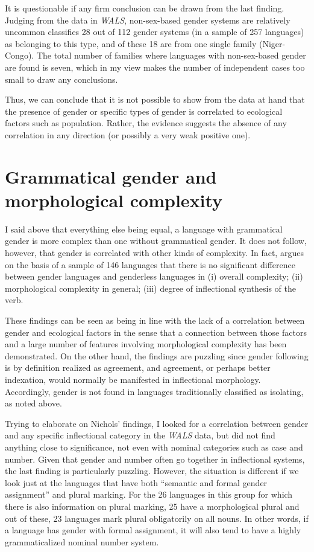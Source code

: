\documentclass[output=collectionpaper]{langsci/langscibook}
\begin{document}
It is questionable if any firm conclusion can be drawn from the last finding. Judging from the data in \textit{WALS}, non-sex-based gender systems are relatively uncommon \textendash{} \citet{Corbett2013b} classifies 28 out of 112 gender systems (in a sample of 257 languages) as belonging to this type, and of these 18 are from one single family (Niger-Congo). The total number of families where languages with non-sex-based gender are found is seven, which in my view makes the number of independent cases too small to draw any conclusions.

Thus, we can conclude that it is not possible to show from the data at hand that the presence of gender \textendash{} or specific types of gender \textendash{} is correlated to ecological factors such as population. Rather, the evidence suggests the absence of any correlation in any direction (or possibly a very weak positive one).

\section{Grammatical gender and morphological complexity}

I said above that everything else being equal, a language with grammatical gender is more complex than one without grammatical gender. It does not follow, however, that gender is correlated with other kinds of complexity. In fact,  argues on the basis of a sample of 146 languages that there is no significant difference between gender languages and genderless languages in (i) overall complexity; (ii) morphological complexity in general; (iii) degree of inflectional synthesis of the verb.

These findings can be seen as being in line with the lack of a correlation between gender and ecological factors in the sense that a connection between those factors and a large number of features involving morphological complexity has been demonstrated. On the other hand, the findings are puzzling since gender \textendash{} following \citet[4]{Corbett1991} \textendash{} is by definition realized as agreement, and agreement, or perhaps better indexation, would normally be manifested in inflectional morphology. Accordingly, gender is not found in languages traditionally classified as isolating, as noted above.

Trying to elaborate on Nichols’ findings, I looked for a correlation between gender and any specific inflectional category in the \textit{WALS} data, but did not find anything close to significance, not even with nominal categories such as case and number. Given that gender and number often go together in inflectional systems, the last finding is particularly puzzling. However, the situation is different if we look just at the languages that have both ``semantic and formal gender assignment'' and plural marking. For the 26 languages in this group for which there is also information on plural marking, 25 have a morphological plural and out of these, 23 languages mark plural obligatorily on all nouns. In other words, if a language has gender with formal assignment, it will also tend to have a highly grammaticalized nominal number system.
\end{document}
